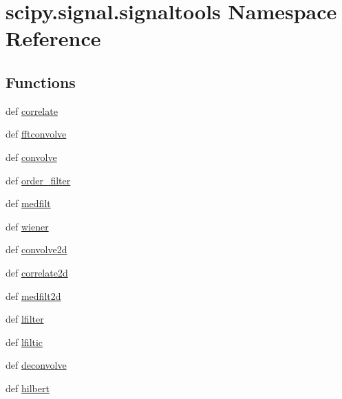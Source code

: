 \hypertarget{namespacescipy_1_1signal_1_1signaltools}{}\section{scipy.\+signal.\+signaltools Namespace Reference}
\label{namespacescipy_1_1signal_1_1signaltools}
\subsection*{Functions}
\begin{DoxyCompactItemize}
\item 
def \hyperlink{namespacescipy_1_1signal_1_1signaltools_a1e29e81a0d22facdc833faa7052f73b1}{correlate}
\item 
def \hyperlink{namespacescipy_1_1signal_1_1signaltools_ab37875bbee2936c9441080f27b3599ce}{fftconvolve}
\item 
def \hyperlink{namespacescipy_1_1signal_1_1signaltools_a1c46662badedd414df4119185906530e}{convolve}
\item 
def \hyperlink{namespacescipy_1_1signal_1_1signaltools_a0372dc55a21c3341518cd3db8a700e4d}{order\+\_\+filter}
\item 
def \hyperlink{namespacescipy_1_1signal_1_1signaltools_a7fa4ace1ce6efb0487ff79447531db71}{medfilt}
\item 
def \hyperlink{namespacescipy_1_1signal_1_1signaltools_aef763ec8579bf17ed3e8a1075ae6933f}{wiener}
\item 
def \hyperlink{namespacescipy_1_1signal_1_1signaltools_abed1aaf4f1dec67fdb5f65f222b87289}{convolve2d}
\item 
def \hyperlink{namespacescipy_1_1signal_1_1signaltools_aeeb2d86fde181c1dbdb04fd07e28c267}{correlate2d}
\item 
def \hyperlink{namespacescipy_1_1signal_1_1signaltools_a3cbf1a46967c8993eac73977c373b789}{medfilt2d}
\item 
def \hyperlink{namespacescipy_1_1signal_1_1signaltools_aee8683bd5f9e963b8a4ff66d55f249e4}{lfilter}
\item 
def \hyperlink{namespacescipy_1_1signal_1_1signaltools_a150dbc1e54a79c247cc7cd3cf4629605}{lfiltic}
\item 
def \hyperlink{namespacescipy_1_1signal_1_1signaltools_a8f9ae32df850efb661fcdcc5d51a4e04}{deconvolve}
\item 
def \hyperlink{namespacescipy_1_1signal_1_1signaltools_a565c325a63c17a4a22bca39e9b118cf3}{hilbert}
\item 

\end{DoxyCompactItemize}
